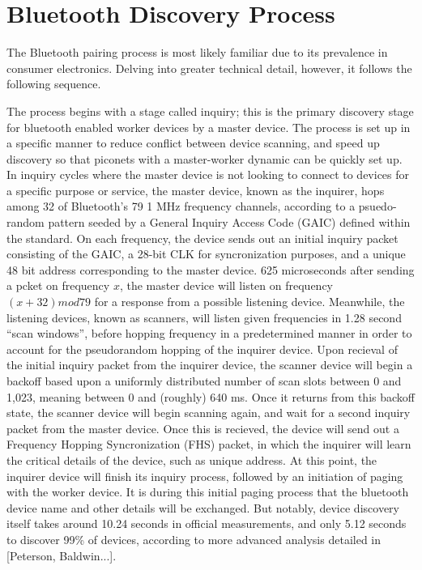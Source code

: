 \section{Bluetooth Discovery Process}
\label{sec:bluetoothdiscovery}

The Bluetooth pairing process is most likely familiar due
to its prevalence in consumer electronics. Delving into
greater technical detail, however, it follows the following
sequence.

The process begins with a stage called inquiry; this is the
primary discovery stage for bluetooth enabled worker devices by
a master device. The process is set up in a specific manner to
reduce conflict between device scanning, and speed up discovery
so that piconets with a master-worker dynamic can be quickly set
up. In inquiry cycles where the master device is not looking to connect
to devices for a specific purpose or service, the master device, known
as the inquirer, hops among 32 of Bluetooth's 79 1 MHz frequency channels,
according to a psuedo-random pattern seeded by a General Inquiry Access
Code (GAIC) defined within the standard. On each frequency, the device sends
out an initial inquiry packet consisting of the GAIC, a 28-bit CLK for
syncronization purposes, and a unique 48 bit address corresponding to the
master device. 625 microseconds after sending a pcket on frequency $x$, the
master device will listen on frequency $(x + 32) mod 79$ for a response from
a possible listening device. Meanwhile, the listening devices, known as scanners,
will listen given frequencies in 1.28 second ``scan windows'', before hopping
frequency in a predetermined manner in order to account for the pseudorandom
hopping of the inquirer device. Upon recieval of the initial inquiry packet from
the inquirer device, the scanner device will begin a backoff based upon a uniformly
distributed number of scan slots between 0 and 1,023, meaning between 0 and (roughly)
640 ms. Once it returns from this backoff state, the scanner device will begin
scanning again, and wait for a second inquiry packet from the master device. Once this
is recieved, the device will send out a Frequency Hopping Syncronization (FHS) packet,
in which the inquirer will learn the critical details of the device, such as
unique address. At this point, the inquirer device will finish its inquiry process, followed
by an initiation of paging with the worker device. It is during this initial paging
process that the bluetooth device name and other details will be exchanged. But notably,
device discovery itself takes around 10.24 seconds in official measurements, and only 5.12
seconds to discover 99\% of devices, according to more advanced analysis detailed in
[Peterson, Baldwin...].

